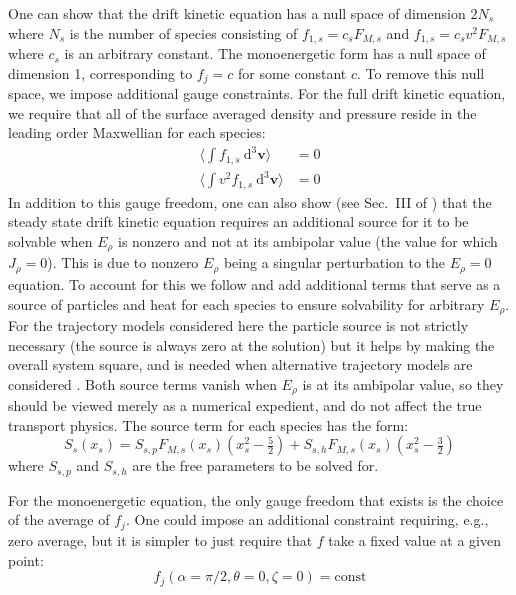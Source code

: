 \documentclass[11pt]{article}
\begin{document}
One can show \cite{landreman_comparison_2014} that the drift kinetic equation
has a null space of
dimension $2N_s$ where $N_s$ is the number of species consisting of
$f_{1,s} = c_s F_{M,s}$ and $f_{1,s} = c_s v^2 F_{M,s}$ where $c_s$ is an
arbitrary constant. The monoenergetic form has a null space of dimension 1,
corresponding to $f_j = c$ for some constant $c$. To remove this null space, we
impose additional gauge constraints. For the full drift kinetic equation, we
require that all of the surface averaged density and pressure reside in the leading order
Maxwellian for each species:
\begin{align}
\Bigg \langle \int f_{1,s} ~\mathrm{d}^3 \mathbf{v} \Bigg \rangle &= 0 \\
\Bigg \langle \int v^2 f_{1,s} ~\mathrm{d}^3 \mathbf{v} \Bigg \rangle &= 0
\end{align}
In addition to this gauge freedom, one can also show (see Sec.~III of
\cite{landreman_comparison_2014}) that the steady state
drift kinetic equation requires an additional source for it to be solvable when
$E_\rho$ is nonzero and not at its ambipolar value (the value for which
$J_\rho=0$). This is due to nonzero $E_\rho$ being a singular perturbation to the
$E_\rho=0$ equation. To account for this we follow \cite{landreman_comparison_2014}
and add additional terms that serve as a source of particles and heat for each species
to ensure solvability for arbitrary $E_\rho$. For the trajectory models considered
here the particle source is not strictly necessary (the source is always zero at the
solution) but it helps by making the overall system square, and is needed when
alternative trajectory models are considered \cite{landreman_comparison_2014}. Both
source terms vanish when $E_\rho$ is at its ambipolar value, so they should be viewed
merely as a numerical expedient, and do not affect the true transport physics. The
source term for each species has the form:
\begin{equation}
S_s(x_s) = S_{s,p} F_{M,s}(x_s)(x_s^2 - \tfrac{5}{2})
+ S_{s,h} F_{M,s}(x_s)(x_s^2 - \tfrac{3}{2})
\end{equation}
where $S_{s,p}$ and $S_{s,h}$ are the free parameters to be solved for.

For the monoenergetic equation, the only gauge freedom that exists is the
choice of the average of $f_j$. One could impose an additional constraint
requiring, e.g., zero average, but it is simpler to just require that $f$ take a
fixed value at a given point:
\begin{equation}
f_j(\alpha=\pi/2, \theta=0, \zeta=0) = \mathrm{const}
\end{equation}
\end{document}
